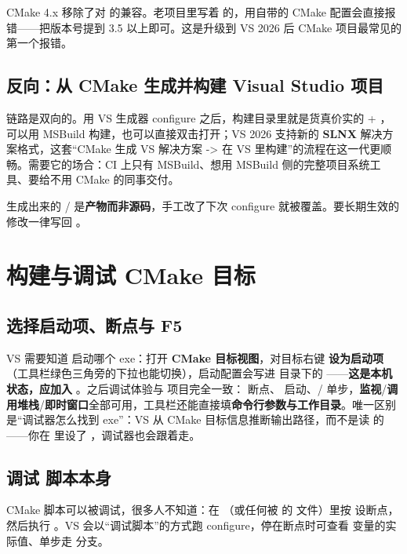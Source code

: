 \begin{warnbox}[注意]
CMake 4.x 移除了对  的兼容。老项目里写着  的，用自带的 CMake 配置会直接报错——把版本号提到 3.5 以上即可。这是升级到 VS 2026 后 CMake 项目最常见的第一个报错。
\end{warnbox}

\subsection{反向：从 CMake 生成并构建 Visual Studio 项目}
链路是双向的。用 VS 生成器 configure 之后，构建目录里就是货真价实的  + ，可以用 MSBuild 构建，也可以直接双击打开；VS 2026 支持新的 \textbf{SLNX} 解决方案格式，这套“CMake 生成 VS 解决方案 -> 在 VS 里构建”的流程在这一代更顺畅。需要它的场合：CI 上只有 MSBuild、想用 MSBuild 侧的完整项目系统工具、要给不用 CMake 的同事交付。

\begin{warnbox}[注意]
生成出来的  /  是\textbf{产物而非源码}，手工改了下次 configure 就被覆盖。要长期生效的修改一律写回 。
\end{warnbox}

\section{构建与调试 CMake 目标}
\subsection{选择启动项、断点与 F5}
VS 需要知道  启动哪个 exe：打开 \textbf{CMake 目标视图}，对目标右键 \textbf{设为启动项}（工具栏绿色三角旁的下拉也能切换），启动配置会写进  目录下的 ——\textbf{这是本机状态，应加入 }。之后调试体验与  项目完全一致： 断点、 启动、/ 单步，\textbf{监视}/\textbf{调用堆栈}/\textbf{即时窗口}全部可用，工具栏还能直接填\textbf{命令行参数与工作目录}。唯一区别是“调试器怎么找到 exe”：VS 从 CMake 目标信息推断输出路径，而不是读  的 ——你在  里设了 ，调试器也会跟着走。

\subsection{调试  脚本本身}
CMake 脚本可以被调试，很多人不知道：在 （或任何被  的  文件）里按  设断点，然后执行 。VS 会以“调试脚本”的方式跑 configure，停在断点时可查看 \code{${}} 变量的实际值、单步走  分支。


